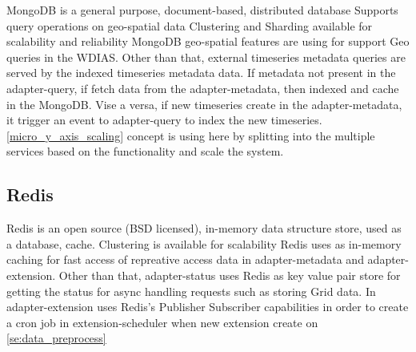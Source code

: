 MongoDB is a general purpose, document-based, distributed database
  Supports query operations on geo-spatial data \cite{mongodbMongoDBManual}
  Clustering and Sharding available for scalability and reliability
MongoDB geo-spatial features are using for support Geo queries in the WDIAS. Other than that, external timeseries metadata queries are served by the indexed timeseries metadata data.
If metadata not present in the adapter-query, if fetch data from the adapter-metadata, then indexed and cache in the MongoDB. Vise a versa, if new timeseries create in the adapter-metadata,
it trigger an event to adapter-query to index the new timeseries.
\ref{micro_y_axis_scaling} concept is using here by splitting into the multiple services based on the functionality and scale the system.

\subsection{Redis}
\label{sub:redis}
  Redis\cite{redisRedisDocumentation} is an open source (BSD licensed), in-memory data structure store, used as a database, cache.
  Clustering is available for scalability
Redis uses as in-memory caching for fast access of repreative access data in adapter-metadata and adapter-extension.
Other than that, adapter-status uses Redis as key value pair store for getting the status for async handling requests such as storing Grid data.
In adapter-extension uses Redis's Publisher Subscriber capabilities in order to create a cron job in extension-scheduler when new extension create on \ref{se:data_preprocess}
